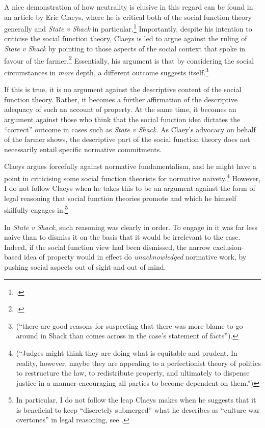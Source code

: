 A nice demonstration of how neutrality is elusive in this regard can be found in an article by Eric Claeys, where he is critical both of the social function theory generally and {\it State v Shack} in particular.\footcite{claeys09} Importantly, despite his intention to criticise the social function theory, Claeys is led to argue against the ruling of {\it State v Shack} by pointing to those aspects of the social context that spoke in favour of the farmer.\footnote{\cite[941-942]{claeys09}.} Essentially, his argument is that by considering the social circumstances in {\it more} depth, a different outcome suggests itself.\footnote{\cite[941]{claeys09} (``there are good reasons for suspecting that there was more blame to go around in Shack than comes across in the case's statement of facts'').} 

If this is true, it is no argument against the descriptive content of the social function theory. Rather, it becomes a further affirmation of the descriptive adequacy of such an account of property. At the same time, it becomes an argument against those who think that the social function idea dictates the ``correct'' outcome in cases such as {\it State v Shack}. As Claey's advocacy on behalf of the farmer shows, the descriptive part of the social function theory does not necessarily entail specific normative commitments.

Claeys argues forcefully against normative fundamentalism, and he might have a point in criticising some social function theorists for normative naivety.\footnote{\cite[945]{claeys09} (``Judges might think they are doing what is equitable and prudent. In reality, however, maybe they are appealing to a perfectionist theory of politics to restructure the law, to redistribute property, and ultimately to dispense justice in a manner encouraging all parties to become dependent on them.'')} However, I do not follow Claeys when he takes this to be an argument against the form of legal reasoning that social function theories promote and which he himself skilfully engages in.\footnote{In particular, I do not follow the leap Claeys makes when he suggests that it is beneficial to keep ``discretely submerged'' what he describes as ``culture war overtones'' in legal reasoning, see \cite[947]{claeys09}.}

In {\it State v Shack}, such reasoning was clearly in order. To engage in it was far less naive than to dismiss it on the basis that it would be irrelevant to the case. Indeed, if the social function view had been dismissed, the narrow exclusion-based idea of property would in effect do {\it unacknowledged} normative work, by pushing social aspects out of sight and out of mind.

